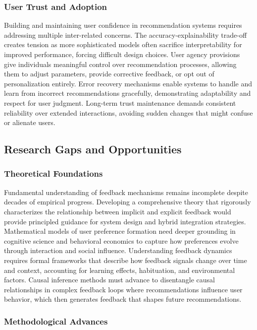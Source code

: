 \subsubsection{User Trust and Adoption}

Building and maintaining user confidence in recommendation systems requires addressing multiple inter-related concerns. The accuracy-explainability trade-off creates tension as more sophisticated models often sacrifice interpretability for improved performance, forcing difficult design choices. User agency provisions give individuals meaningful control over recommendation processes, allowing them to adjust parameters, provide corrective feedback, or opt out of personalization entirely. Error recovery mechanisms enable systems to handle and learn from incorrect recommendations gracefully, demonstrating adaptability and respect for user judgment. Long-term trust maintenance demands consistent reliability over extended interactions, avoiding sudden changes that might confuse or alienate users.

\subsection{Research Gaps and Opportunities}

\subsubsection{Theoretical Foundations}

Fundamental understanding of feedback mechanisms remains incomplete despite decades of empirical progress. Developing a comprehensive theory that rigorously characterizes the relationship between implicit and explicit feedback would provide principled guidance for system design and hybrid integration strategies. Mathematical models of user preference formation need deeper grounding in cognitive science and behavioral economics to capture how preferences evolve through interaction and social influence. Understanding feedback dynamics requires formal frameworks that describe how feedback signals change over time and context, accounting for learning effects, habituation, and environmental factors. Causal inference methods must advance to disentangle causal relationships in complex feedback loops where recommendations influence user behavior, which then generates feedback that shapes future recommendations.

\subsubsection{Methodological Advances}


